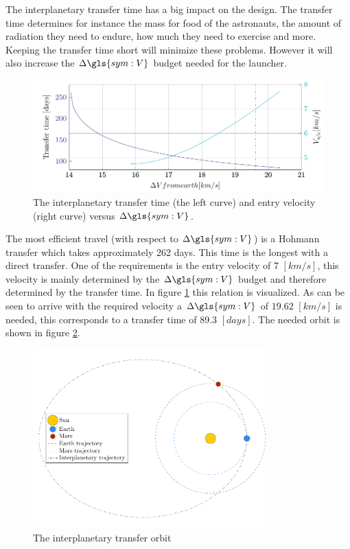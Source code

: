 The interplanetary transfer time has a big impact on the design. The transfer time determines for instance the mass for food of the astronauts, the amount of radiation they need to endure, how much they need to exercise and more. Keeping the transfer time short will minimize these problems. However it will also increase the $\Delta \gls{sym:V}$ budget needed for the launcher. 

\begin{figure}[h!]
	\centering
	\includegraphics[width=1\textwidth]{Figure/Inter_transfer/transfer_time.pdf}
	\caption{The interplanetary transfer time (the left curve) and entry velocity (right curve) versus $\Delta \gls{sym:V}$.}
	\label{fig:inter_time}
\end{figure}

The most efficient travel (with respect to $\Delta \gls{sym:V}$) is a Hohmann transfer which takes approximately 262 days. This time is the longest with a direct transfer. One of the requirements is the entry velocity of 7 $\left[km /s\right]$, this velocity is mainly determined by the $\Delta \gls{sym:V}$ budget and therefore determined by the transfer time. In figure \ref{fig:inter_time} this relation is visualized. As can be seen to arrive with the required velocity a $\Delta \gls{sym:V}$ of $19.62$ $\left[km /s\right]$ is needed, this corresponds to a transfer time of 89.3 $\left[days\right]$. The needed orbit is shown in figure \ref{fig:inter_orbit}.

\begin{figure}[h!]
	\centering
	\includegraphics[width=0.8\textwidth]{Figure/Inter_transfer/orbits.pdf}
	\caption{The interplanetary transfer orbit}
	\label{fig:inter_orbit}
\end{figure}
